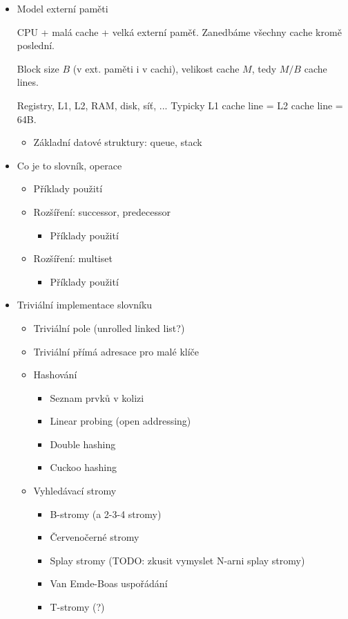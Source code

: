 \begin{itemize}
\item Model externí paměti

	CPU + malá cache + velká externí paměť.
	Zanedbáme všechny cache kromě poslední.

	Block size $B$ (v ext. paměti i v cachi),
	velikost cache $M$, tedy $M/B$ cache lines.

	Registry, L1, L2, RAM, disk, síť, ...
	Typicky L1 cache line = L2 cache line = 64B.
	\cite{Vit}

	\begin{itemize}
	\item Základní datové struktury: queue, stack
	\end{itemize}

\item Co je to slovník, operace
	\begin{itemize}
	\item Příklady použití
	\item Rozšíření: successor, predecessor
		\begin{itemize}
		\item Příklady použití
		\end{itemize}
	\item Rozšíření: multiset
		\begin{itemize}
		\item Příklady použití
		\end{itemize}
	\end{itemize}

\item Triviální implementace slovníku
	\begin{itemize}
	\item Triviální pole (unrolled linked list?)
	\item Triviální přímá adresace pro malé klíče

\item Hashování
	\begin{itemize}
		\item Seznam prvků v kolizi
		\item Linear probing (open addressing)
		\item Double hashing
		\item Cuckoo hashing
	\end{itemize}

\item Vyhledávací stromy
	\begin{itemize}
		\item B-stromy (a 2-3-4 stromy)
		\item Červenočerné stromy
		\item Splay stromy (TODO: zkusit vymyslet N-arni splay stromy)
		\item Van Emde-Boas uspořádání
		\item T-stromy (?)
	\end{itemize}


\end{itemize}
\end{itemize}
